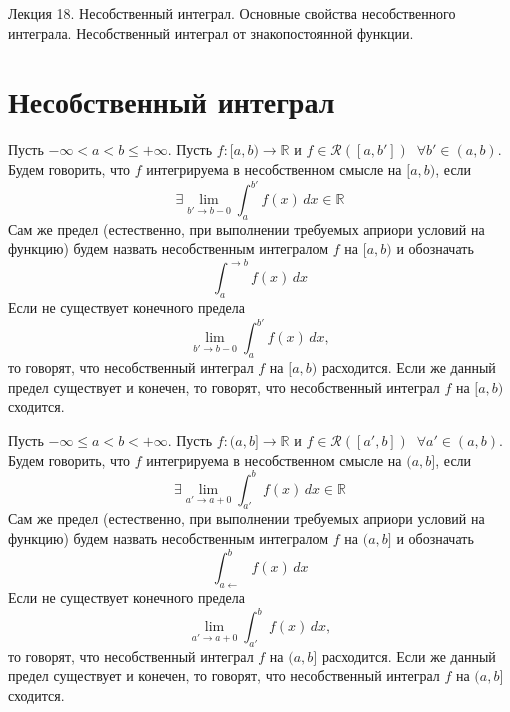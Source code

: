 \documentclass[11pt]{article}
\begin{document}
\begin{titlepage}
    \centering
    \vspace*{\fill}  %

    {\Huge Лекция 18. Несобственный интеграл. Основные свойства несобственного интеграла. Несобственный интеграл от знакопостоянной функции.
    \par}

    \vspace*{\fill}  %
\end{titlepage}

\setcounter{page}{1}

\section{Несобственный интеграл}

\begin{definition}
    Пусть $- \infty < a < b \leq + \infty$. Пусть $f \colon [a, b) \to \mathbb{R}$ и $f \in \mathcal{R}([a, b']) \; \; \forall b' \in (a, b)$. Будем говорить, что $f$ интегрируема в несобственном смысле на $[a, b)$, если
    \[\exists \lim_{b' \to b - 0} \int_{a}^{b'} f(x) \,dx \in \mathbb{R}\]
    Сам же предел (естественно, при выполнении требуемых априори условий на функцию) будем назвать несобственным интегралом $f$ на $[a, b)$ и обозначать
    \[\int_{a}^{\to b} f(x) \,dx\]
    Если не существует конечного предела 
    \[\lim_{b' \to b - 0} \int_{a}^{b'} f(x) \, dx,\]
    то говорят, что несобственный интеграл $f$ на $[a, b)$ расходится. Если же данный предел существует и конечен, то говорят, что несобственный интеграл $f$ на $[a, b)$ сходится.
\end{definition}

\begin{definition}
    Пусть $- \infty \leq a < b < + \infty$. Пусть $f \colon (a, b] \to \mathbb{R}$ и $f \in \mathcal{R}([a', b]) \; \; \forall a' \in (a, b)$. Будем говорить, что $f$ интегрируема в несобственном смысле на $(a, b]$, если
    \[\exists \lim_{a' \to a + 0} \int_{a'}^{b} f(x) \,dx \in \mathbb{R}\]
    Сам же предел (естественно, при выполнении требуемых априори условий на функцию) будем назвать несобственным интегралом $f$ на $(a, b]$ и обозначать
    \[\int_{a \leftarrow}^{b} f(x) \,dx\]
    Если не существует конечного предела 
    \[\lim_{a' \to a + 0} \int_{a'}^{b} f(x) \, dx,\]
    то говорят, что несобственный интеграл $f$ на $(a, b]$ расходится. Если же данный предел существует и конечен, то говорят, что несобственный интеграл $f$ на $(a, b]$ сходится.
\end{definition}
\end{document}
